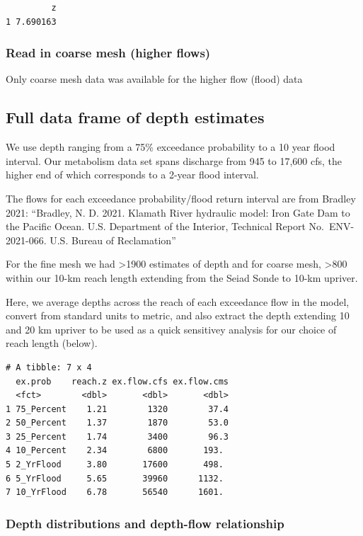 \documentclass[
  letterpaper,
  DIV=11,
  numbers=noendperiod]{scrartcl}
\begin{document}
\begin{verbatim}
         z
1 7.690163
\end{verbatim}

\subsubsection{Read in coarse mesh (higher
flows)}\label{read-in-coarse-mesh-higher-flows}

Only coarse mesh data was available for the higher flow (flood) data

\subsection{Full data frame of depth
estimates}\label{full-data-frame-of-depth-estimates}

We use depth ranging from a 75\% exceedance probability to a 10 year
flood interval. Our metabolism data set spans discharge from 945 to
17,600 cfs, the higher end of which corresponds to a 2-year flood
interval.

The flows for each exceedance probability/flood return interval are from
Bradley 2021: ``Bradley, N. D. 2021. Klamath River hydraulic model: Iron
Gate Dam to the Pacific Ocean. U.S. Department of the Interior,
Technical Report No.~ENV-2021-066. U.S. Bureau of Reclamation''

For the fine mesh we had \textgreater1900 estimates of depth and for
coarse mesh, \textgreater800 within our 10-km reach length extending
from the Seiad Sonde to 10-km upriver.

Here, we average depths across the reach of each exceedance flow in the
model, convert from standard units to metric, and also extract the depth
extending 10 and 20 km upriver to be used as a quick sensitivey analysis
for our choice of reach length (below).

\begin{verbatim}
# A tibble: 7 x 4
  ex.prob    reach.z ex.flow.cfs ex.flow.cms
  <fct>        <dbl>       <dbl>       <dbl>
1 75_Percent    1.21        1320        37.4
2 50_Percent    1.37        1870        53.0
3 25_Percent    1.74        3400        96.3
4 10_Percent    2.34        6800       193. 
5 2_YrFlood     3.80       17600       498. 
6 5_YrFlood     5.65       39960      1132. 
7 10_YrFlood    6.78       56540      1601. 
\end{verbatim}

\subsubsection{Depth distributions and depth-flow
relationship}\label{depth-distributions-and-depth-flow-relationship}
\end{document}
